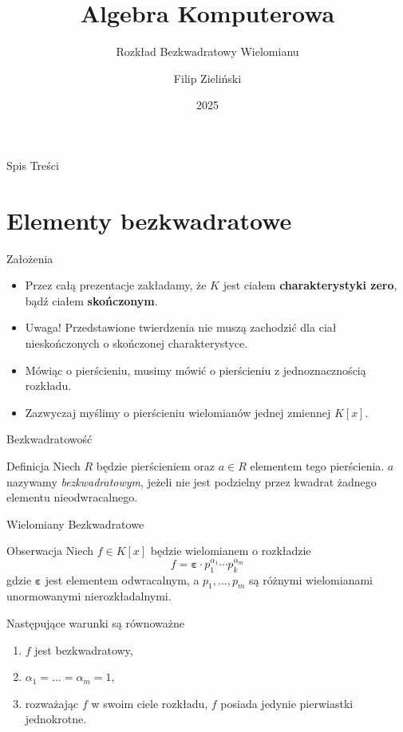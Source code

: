 \documentclass{beamer}
\title{Algebra Komputerowa}
\subtitle{Rozkład Bezkwadratowy Wielomianu \cite{ComputerAlgebra,LCM}}
\author{Filip Zieli\'nski}
\date{2025}
\renewcommand{\epsilon}{\bm{\varepsilon}}
\begin{document}
\begin{frame}
    \titlepage
\end{frame}
 
\begin{frame}{Spis Treści}
    \tableofcontents
\end{frame}

\section{Elementy bezkwadratowe}
\begin{frame}{Założenia}
    \begin{itemize}
        \item Przez całą prezentacje zakładamy, że $K$ jest ciałem \textbf{charakterystyki zero}, bądź ciałem \textbf{skończonym}.
        \item Uwaga! Przedstawione twierdzenia nie muszą zachodzić dla ciał nieskończonych o skończonej charakterystyce.
        \item Mówiąc o pierścieniu, musimy mówić o pierścieniu z jednoznacznością rozkładu.
        \item Zazwyczaj myślimy o pierścieniu wielomianów jednej zmiennej $K[x]$.
    \end{itemize}
\end{frame}

\begin{frame}{Bezkwadratowość}
    \begin{block}{Definicja}
        Niech $R$ będzie pierścieniem oraz $a \in R$ elementem tego pierścienia. $a$ nazywamy \textit{bezkwadratowym}, jeżeli nie jest podzielny przez kwadrat żadnego elementu nieodwracalnego.
    \end{block}
\end{frame}

\begin{frame}{Wielomiany Bezkwadratowe}
    \begin{alertblock}{Obserwacja}
        Niech $f \in K[x]$ będzie wielomianem o rozkładzie 
        $$f = \epsilon \cdot p_1^{\alpha_1} \cdots p_k^{\alpha_m} $$ 
        gdzie $\epsilon$ jest elementem odwracalnym, a $p_1,\ldots, p_m$ są różnymi wielomianami unormowanymi nierozkładalnymi. 

        Następujące warunki są równoważne
        \begin{enumerate}
            \item $f$ jest bezkwadratowy,
            \item $\alpha_1 = \ldots = \alpha_m = 1$,
            \item rozważając $f$ w swoim ciele rozkładu, $f$ posiada jedynie pierwiastki jednokrotne.
        \end{enumerate}
    \end{alertblock}
\end{frame}
\end{document}
